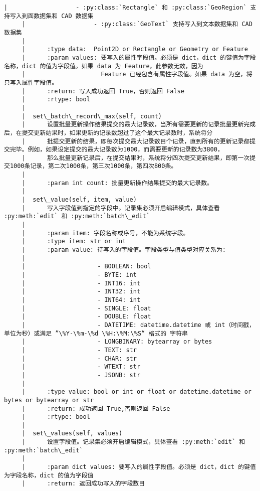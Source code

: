 \documentclass[11pt]{article}
\begin{document}
\begin{Verbatim}[commandchars=\\\{\}]
     |                   - :py:class:`Rectangle` 和 :py:class:`GeoRegion` 支持写入到面数据集和 CAD 数据集
     |                   - :py:class:`GeoText` 支持写入到文本数据集和 CAD 数据集
     |      
     |      :type data:  Point2D or Rectangle or Geometry or Feature
     |      :param values: 要写入的属性字段值。必须是 dict，dict 的键值为字段名称，dict 的值为字段值。如果 data 为 Feature，此参数无效，因为
     |                     Feature 已经包含有属性字段值。如果 data 为空，将只写入属性字段值。
     |      :return: 写入成功返回 True，否则返回 False
     |      :rtype: bool
     |  
     |  set\_batch\_record\_max(self, count)
     |      设置批量更新操作结果提交的最大记录数，当所有需要更新的记录批量更新完成后，在提交更新结果时，如果更新的记录数超过了这个最大记录数时，系统将分
     |      批提交更新的结果，即每次提交最大记录数目个记录，直到所有的更新记录都提交完毕。例如，如果设定提交的最大记录数为1000，而需要更新的记录数为3800，
     |      那么批量更新记录后，在提交结果时，系统将分四次提交更新结果，即第一次提交1000条记录，第二次1000条，第三次1000条，第四次800条。
     |      
     |      :param int count: 批量更新操作结果提交的最大记录数。
     |  
     |  set\_value(self, item, value)
     |      写入字段值到指定的字段中。记录集必须开启编辑模式，具体查看 :py:meth:`edit` 和 :py:meth:`batch\_edit`
     |      
     |      :param item: 字段名称或序号，不能为系统字段。
     |      :type item: str or int
     |      :param value: 待写入的字段值。字段类型与值类型对应关系为:
     |      
     |                    - BOOLEAN: bool
     |                    - BYTE: int
     |                    - INT16: int
     |                    - INT32: int
     |                    - INT64: int
     |                    - SINGLE: float
     |                    - DOUBLE: float
     |                    - DATETIME: datetime.datetime 或 int（时间戳，单位为秒）或满足 ”\%Y-\%m-\%d \%H:\%M:\%S“ 格式的 字符串
     |                    - LONGBINARY: bytearray or bytes
     |                    - TEXT: str
     |                    - CHAR: str
     |                    - WTEXT: str
     |                    - JSONB: str
     |      
     |      :type value: bool or int or float or datetime.datetime or bytes or bytearray or str
     |      :return: 成功返回 True,否则返回 False
     |      :rtype: bool
     |  
     |  set\_values(self, values)
     |      设置字段值。记录集必须开启编辑模式，具体查看 :py:meth:`edit` 和 :py:meth:`batch\_edit`
     |      
     |      :param dict values: 要写入的属性字段值。必须是 dict，dict 的键值为字段名称，dict 的值为字段值
     |      :return: 返回成功写入的字段数目

\end{Verbatim}
\end{document}

